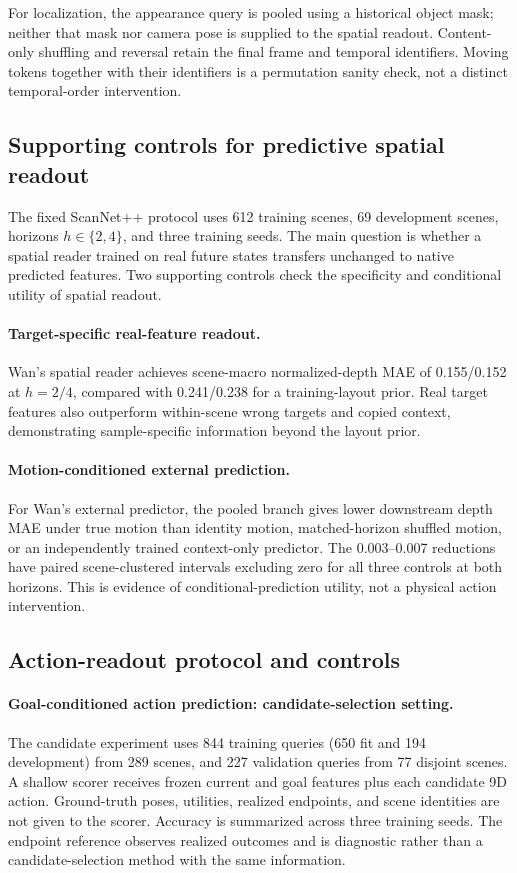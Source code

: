 \documentclass{article} %
\begin{document}
For localization, the appearance query is pooled using a historical
object mask; neither that mask nor camera pose is supplied to the spatial
readout. Content-only shuffling and reversal retain the final frame and
temporal identifiers. Moving tokens together with their identifiers is
a permutation sanity check, not a distinct temporal-order intervention.

\subsection{Supporting controls for predictive spatial readout}
\label{sec:predictive-readout-controls}
The fixed ScanNet++ protocol uses 612 training scenes, 69 development
scenes, horizons $h\in\{2,4\}$, and three training seeds. The main
question is whether a spatial reader trained on real future states
transfers unchanged to native predicted features. Two supporting controls
check the specificity and conditional utility of spatial readout.

\paragraph{Target-specific real-feature readout.}
Wan's spatial reader achieves scene-macro normalized-depth MAE of
0.155/0.152 at $h=2/4$, compared with 0.241/0.238 for a training-layout
prior. Real target features also outperform within-scene wrong targets
and copied context, demonstrating sample-specific information beyond
the layout prior.

\paragraph{Motion-conditioned external prediction.}
For Wan's external predictor, the pooled branch gives lower downstream
depth MAE under true motion than identity motion, matched-horizon shuffled
motion, or an independently trained context-only predictor. The
0.003--0.007 reductions have paired scene-clustered intervals excluding
zero for all three controls at both horizons. This is evidence of
conditional-prediction utility, not a physical action intervention.

\subsection{Action-readout protocol and controls}
\label{sec:action-protocol-details}

\paragraph{Goal-conditioned action prediction: candidate-selection setting.}
The candidate experiment uses 844 training queries (650 fit and 194
development) from 289 scenes, and 227 validation queries from 77
disjoint scenes. A shallow scorer receives frozen current and goal
features plus each candidate 9D action. Ground-truth poses, utilities,
realized endpoints, and scene identities are not given to the scorer.
Accuracy is summarized across three training seeds. The endpoint
reference observes realized outcomes and is diagnostic rather than a
candidate-selection method with the same information.
\end{document}

